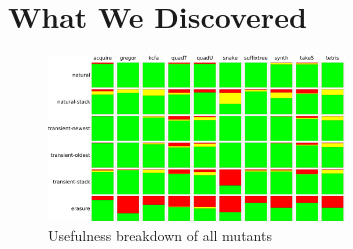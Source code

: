 \section{What We Discovered}

\begin{figure}
  \centering
  \includegraphics[width=0.7\textwidth]{./plots/usefulness-table}
  \caption{Usefulness breakdown of all mutants}
  \label{fig:usefulness-table}
\end{figure}





